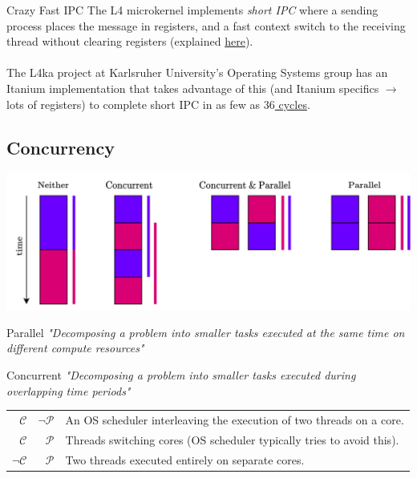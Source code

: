 \begin{sidenotebox}{Crazy Fast IPC}
    The L4 microkernel implements \textit{short IPC} where a sending process places the message in registers, and a fast context switch to the receiving thread without clearing registers (explained \href{https://os.itec.kit.edu/downloads/sa_2002_wenske-horst_fast-local-ipc.pdf}{here}).
    \\
    \\ The L4ka project at Karlsruher University's Operating Systems group has an Itanium implementation that takes advantage of this (and Itanium specifics $\to$ lots of registers) to complete short IPC in as few as \href{https://www.cs.hs-rm.de/~kaiser/2020_aos/05b-ukx6.pdf}{$36$ cycles}.
\end{sidenotebox}

\subsection{Concurrency}
\begin{center}
    \includegraphics[width=.8\textwidth]{parallelism/images/concurrent_vs_parallel.drawio.png}
\end{center}
\begin{tcbraster}[raster columns=2,raster equal height]
\begin{definitionbox}{Parallel}
    \textit{"Decomposing a problem into smaller tasks executed at the same time on different compute resources"}
\end{definitionbox}
\begin{definitionbox}{Concurrent}
    \textit{"Decomposing a problem into smaller tasks executed during overlapping time periods"}
\end{definitionbox}
\end{tcbraster}
\begin{center}
    \begin{tabular}{r r p{}}
        $\mathcal{C}$ & $\neg \mathcal{P}$ & An OS scheduler interleaving the execution of two threads on a core. \\
        $\mathcal{C}$ & $\mathcal{P}$      & Threads switching cores (OS scheduler typically tries to avoid this). \\
        $\neg \mathcal{C}$ & $\mathcal{P}$ & Two threads executed entirely on separate cores. \\
    \end{tabular}
\end{center}

